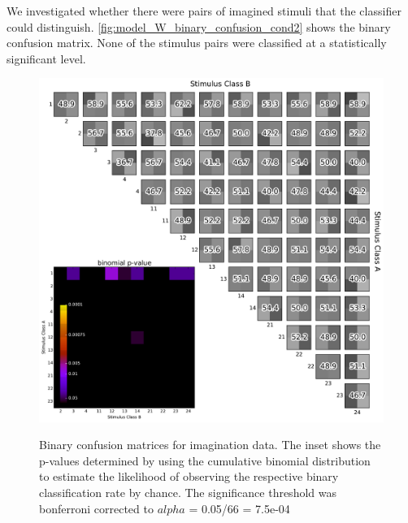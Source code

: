 We investigated whether there were pairs of imagined stimuli that the classifier could distinguish.
\autoref{fig:model_W_binary_confusion_cond2} shows the binary confusion matrix.
None of the stimulus pairs were classified at a statistically significant level. \begin{figure}[h] 
  \begin{center}
    \includegraphics[width=.75\textwidth,keepaspectratio=true]{Figures/model_W_binary_confusion_cond2}
   \\\vspace{-0.8em}
    \caption{Binary confusion matrices for imagination data.
    The inset shows the p-values determined by using the cumulative binomial distribution to estimate the likelihood of observing the respective binary classification rate by chance. The significance threshold was bonferroni corrected to $alpha$ =  0.05/66 = 7.5e-04}
    \label{fig:model_W_binary_confusion_cond2}
  \end{center}
  \vspace{-1em}
\end{figure}
\newpage
